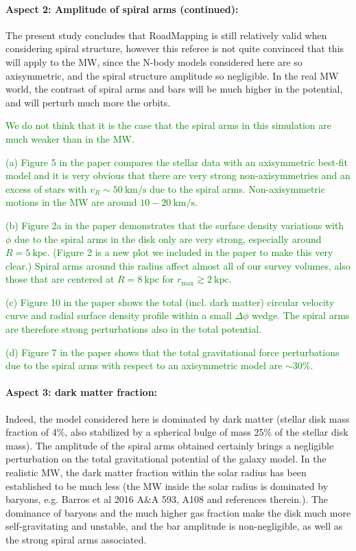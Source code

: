 \documentclass[10pt,a4paper]{article}
\newcommand{\Answer}[1]{\textcolor{Green}{#1}}
\begin{document}
\paragraph{Aspect 2: Amplitude of spiral arms (continued):} The present study concludes that RoadMapping is still relatively valid when considering spiral structure, however this referee is not quite convinced that this
will apply to the MW, since the N-body models considered here are so axisymmetric,
and the spiral structure amplitude so negligible. In the real MW world, the contrast
of spiral arms and bars will be much higher in the potential, and will perturb much
more the orbits.  

\Answer{We do not think that it is the case that the spiral arms in this simulation are much weaker than in the MW.}

\Answer{(a) Figure 5 in the paper compares the stellar data with an axisymmetric best-fit model and it is very obvious that there are very strong non-axisymmetries and an excess of stars with $v_R\sim 50~\text{km/s}$ due to the spiral arms. Non-axisymmetric motions in the MW are around $10-20~\text{km/s}$.}

\Answer{(b) Figure 2a in the paper demonstrates that the surface density variations with $\phi$ due to the spiral arms in the disk only are very strong, especially around $R=5~\text{kpc}$. (Figure 2 is a new plot we included in the paper to make this very clear.) Spiral arms around this radius affect almost all of our survey volumes, also those that are centered at $R=8~\text{kpc}$ for $r_\text{max}\gtrsim2~\text{kpc}$.}

\Answer{(c) Figure 10 in the paper shows the total (incl. dark matter) circular velocity curve and radial surface density profile within a small $\Delta \phi$ wedge. The spiral arms are therefore strong perturbations also in the total potential.}

\Answer{(d) Figure 7 in the paper shows that the total gravitational force perturbations due to the spiral arms with respect to an axisymmetric model are $\sim30\%$.}

\paragraph{Aspect 3: dark matter fraction:} Indeed, the model considered here is dominated by dark matter (stellar disk mass fraction of 4\%, also stabilized by a spherical bulge of mass 25\% of the stellar disk mass). The amplitude of the spiral arms obtained certainly brings a negligible
perturbation on the total gravitational potential of the galaxy model. In the
realistic MW, the dark matter fraction within the solar radius has been established
to be much less (the MW inside the solar radius is dominated by baryons, e.g. Barros
et al 2016 A\&A 593, A108 and references therein.). The dominance of baryons and the
much higher gas fraction make the disk much more self-gravitating and unstable, and
the bar amplitude is non-negligible, as well as the strong spiral arms associated.
\end{document}

